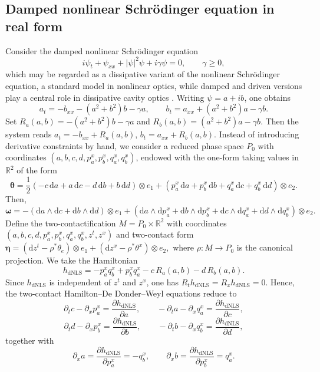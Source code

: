 \documentclass[11pt,a4paper]{article}
\newcommand{\dd}{\mathrm{d}}
\theoremstyle{plain} \newtheorem{theorem}{Theorem}[section] \newtheorem{proposition}[theorem]{Proposition} \newtheorem{corollary}[theorem]{Corollary} \newtheorem{lemma}[theorem]{Lemma} \theoremstyle{definition} \newtheorem{definition}[theorem]{Definition} \theoremstyle{remark} \newtheorem{remark}[theorem]{Remark} \newtheorem{example}[theorem]{Example} %
\begin{document}
\subsection{Damped nonlinear Schr\"odinger equation in real form} \label{subsec:dNLS} Consider the damped nonlinear Schr\"odinger equation \begin{equation}\label{eq:damped_NLS} i\psi_t+\psi_{xx}+|\psi|^2\psi+i\gamma\psi=0,\qquad \gamma\ge0, \end{equation} which may be regarded as a dissipative variant of the nonlinear Schr\"odinger equation, a standard model in nonlinear optics, while damped and driven versions play a central role in dissipative cavity optics \cite{SulemSulem1999,LugiatoLefever1987,KippenbergEtAl2018}. Writing \(\psi=a+ib\), one obtains \[ a_t=-b_{xx}-(a^2+b^2)b-\gamma a,\qquad b_t=a_{xx}+(a^2+b^2)a-\gamma b. \] Set \(R_a(a,b)=-(a^2+b^2)b-\gamma a\) and \(R_b(a,b)=(a^2+b^2)a-\gamma b\). Then the system reads \(a_t=-b_{xx}+R_a(a,b)\), \(b_t=a_{xx}+R_b(a,b)\). Instead of introducing derivative constraints by hand, we consider a reduced phase space \(P_0\) with coordinates \((a,b,c,d,p_a^x,p_b^x,q_a^x,q_b^x)\), endowed with the one-form taking values in $\mathbb{R}^2$ of the form
\[ 
\bm\theta=\frac12(-c\,\dd a+a\,\dd c-d\,\dd b+b\,\dd d)\otimes e_1+(p_a^x\,\dd a+p_b^x\,\dd b+q_a^x\,\dd c+q_b^x\,\dd d)\otimes e_2. 
\] 
Then, 
\[\bm \omega=-(\dd a\wedge \dd c+\dd b\wedge \dd d)\otimes e_1+(\dd a\wedge \dd p_a^x+\dd b\wedge \dd p_b^x+\dd c\wedge \dd q_a^x+\dd d\wedge \dd q_b^x)\otimes e_2.
\]
Define the two-contactification \(M=P_0\times\mathbb R^2\) with coordinates \((a,b,c,d,p_a^x,p_b^x,q_a^x,q_b^x,z^t,z^x)\) and  two-contact form  \(\bm\eta=(\dd z^t-\rho^*\theta_e)\otimes e_1+(\dd z^x-\rho^*\theta^x)\otimes e_2,\) where $\rho:M
\rightarrow P_0$ is the canonical projection. 
We take the Hamiltonian 
\[ h_{\mathrm{dNLS}}=-p_a^x q_b^x+p_b^x q_a^x-c\,R_a(a,b)-d\,R_b(a,b). \] 
Since \(h_{\mathrm{dNLS}}\) is independent of \(z^t\) and \(z^x\), one has \( R_t h_{\mathrm{dNLS}}= R_x h_{\mathrm{dNLS}}=0\). Hence, the two-contact Hamilton--De Donder--Weyl equations reduce to 
\[ \partial_t c-\partial_x p_a^x=\frac{\partial h_{\mathrm{dNLS}}}{\partial a},\qquad -\partial_t a-\partial_x q_a^x=\frac{\partial h_{\mathrm{dNLS}}}{\partial c}, \] 
\[ \partial_t d-\partial_x p_b^x=\frac{\partial h_{\mathrm{dNLS}}}{\partial b},\qquad -\partial_t b-\partial_x q_b^x=\frac{\partial h_{\mathrm{dNLS}}}{\partial d}, \] 
together with 
\[ \partial_x a=\frac{\partial h_{\mathrm{dNLS}}}{\partial p_a^x}=-q_b^x,\qquad \partial_x b=\frac{\partial h_{\mathrm{dNLS}}}{\partial p_b^x}=q_a^x. \] 
\end{document}
